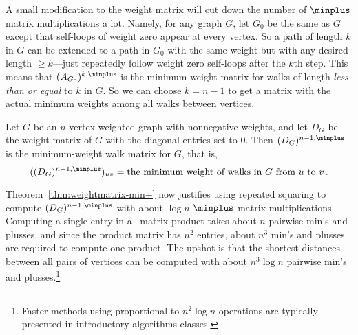 A small modification to the weight matrix will cut down the number of
$\minplus$ matrix multiplications a lot.  Namely, for any graph $G$,
let $G_0$ be the same as $G$ except that self-loops of weight zero
appear at every vertex.  So a path of length $k$ in $G$ can be
extended to a path in $G_0$ with the same weight but with any desired
length $\geq k$---just repeatedly follow weight zero self-loops after
the $k$th step.  This means that $(A_{G_0})^{k, \minplus}$ is the
minimum-weight matrix for walks of length \emph{less than or equal} to
$k$ in $G$.  So we can choose $k = n-1$ to get a matrix with the
actual minimum weights among all walks between vertices.

\begin{theorem}\label{thm:minweightmatrix}
Let $G$ be an $n$-vertex weighted graph with nonnegative weights, and let
$D_G$ be the weight matrix of $G$ with the diagonal entries set to 0.
Then $(D_G)^{n-1, \minplus}$ is the minimum-weight walk matrix for $G$, that
is,
\[
((D_G)^{n-1, \minplus})_{uv} = \text{the minimum weight of walks in $G$ from
 $u$ to $v$}\,.
\]
\end{theorem}
Theorem~\ref{thm:weightmatrix-min+} now justifies using repeated
squaring to compute $(D_G)^{n-1, \minplus}$ with about $\log n$
$\minplus$ matrix multiplications.  Computing a single entry in a
\minplus\ matrix product takes about $n$ pairwise min's and plusses,
and since the product matrix has $n^2$ entries, about $n^3$ min's and
plusses are required to compute one product.  The upshot is that the
shortest distances between all pairs of vertices can be computed with
about $n^3\log n$ pairwise min's and plusses.\footnote{Faster methods
  using proportional to $n^2\log n$ operations are typically presented
  in introductory algorithms classes.}
